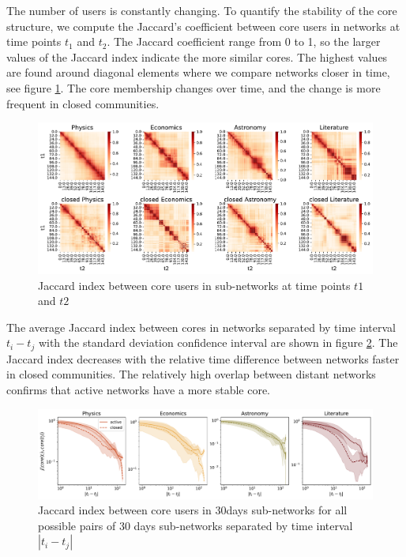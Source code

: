 The number of users is constantly changing. To quantify the stability of the core structure, we compute the Jaccard's coefficient between core users in networks at time points $t_1$ and $t_2$. The Jaccard coefficient range from 0 to 1, so the larger values of the Jaccard index indicate the more similar cores. 
The highest values are found around diagonal elements where we compare networks closer in time, see figure \ref{fig:jaccard_hm}. The core membership changes over time, and the change is more frequent in closed communities. 

\begin{figure}[h!]
	\centering
	\includegraphics[width=\linewidth]{figures/stackexchange/jaccard_heatmap.pdf}
	\caption{Jaccard index between core users in  sub-networks at time points $t1$ and $t2$}
	\label{fig:jaccard_hm}
\end{figure}  

The average Jaccard index between cores in networks separated by time interval $t_i-t_j$ with the standard deviation confidence interval are shown in figure \ref{fig:jaccard_mean}. The Jaccard index decreases with the relative time difference between networks faster in closed communities. The relatively high overlap between distant networks confirms that active networks have a more stable core. 

\begin{figure}[h!]
	\centering
	\includegraphics[width=\linewidth]{figures/stackexchange/jaccard.pdf}
	\caption{Jaccard index between core users in 30days sub-networks for all possible pairs of 30 days sub-networks separated by time interval $|t_i - t_j|$}
	\label{fig:jaccard_mean}
\end{figure}

